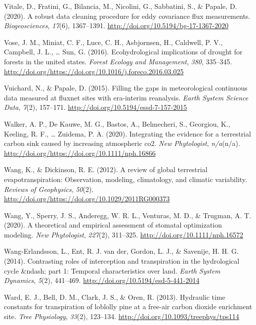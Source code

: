 \documentclass[11pt,twoside]{reedthesis}
\begin{document}
\hypertarget{ref-Vitale2020}{}
Vitale, D., Fratini, G., Bilancia, M., Nicolini, G., Sabbatini, S., \&
Papale, D. (2020). A robust data cleaning procedure for eddy covariance
flux measurements. \emph{Biogeosciences}, \emph{17}(6), 1367--1391.
\url{http://doi.org/10.5194/bg-17-1367-2020}

\hypertarget{ref-Vose2016}{}
Vose, J. M., Miniat, C. F., Luce, C. H., Asbjornsen, H., Caldwell, P.
V., Campbell, J. L., \ldots{} Sun, G. (2016). Ecohydrological
implications of drought for forests in the united states. \emph{Forest
Ecology and Management}, \emph{380}, 335--345.
\url{http://doi.org/https://doi.org/10.1016/j.foreco.2016.03.025}

\hypertarget{ref-Vuichard2015}{}
Vuichard, N., \& Papale, D. (2015). Filling the gaps in meteorological
continuous data measured at fluxnet sites with era-interim reanalysis.
\emph{Earth System Science Data}, \emph{7}(2), 157--171.
\url{http://doi.org/10.5194/essd-7-157-2015}

\hypertarget{ref-Walker2020}{}
Walker, A. P., De Kauwe, M. G., Bastos, A., Belmecheri, S., Georgiou,
K., Keeling, R. F., \ldots{} Zuidema, P. A. (2020). Integrating the
evidence for a terrestrial carbon sink caused by increasing atmospheric
co2. \emph{New Phytologist}, \emph{n/a}(n/a).
\url{http://doi.org/https://doi.org/10.1111/nph.16866}

\hypertarget{ref-WangDickinson2012}{}
Wang, K., \& Dickinson, R. E. (2012). A review of global terrestrial
evapotranspiration: Observation, modeling, climatology, and climatic
variability. \emph{Reviews of Geophysics}, \emph{50}(2).
\url{http://doi.org/https://doi.org/10.1029/2011RG000373}

\hypertarget{ref-Wang2020}{}
Wang, Y., Sperry, J. S., Anderegg, W. R. L., Venturas, M. D., \&
Trugman, A. T. (2020). A theoretical and empirical assessment of
stomatal optimization modeling. \emph{New Phytologist}, \emph{227}(2),
311--325. \url{http://doi.org/10.1111/nph.16572}

\hypertarget{ref-Wang-Erlandsson2014}{}
Wang-Erlandsson, L., Ent, R. J. van der, Gordon, L. J., \& Savenije, H.
H. G. (2014). Contrasting roles of interception and transpiration in the
hydrological cycle \&ndash; part 1: Temporal characteristics over land.
\emph{Earth System Dynamics}, \emph{5}(2), 441--469.
\url{http://doi.org/10.5194/esd-5-441-2014}

\hypertarget{ref-Ward2013}{}
Ward, E. J., Bell, D. M., Clark, J. S., \& Oren, R. (2013). Hydraulic
time constants for transpiration of loblolly pine at a free-air carbon
dioxide enrichment site. \emph{Tree Physiology}, \emph{33}(2), 123--134.
\url{http://doi.org/10.1093/treephys/tps114}
\end{document}
